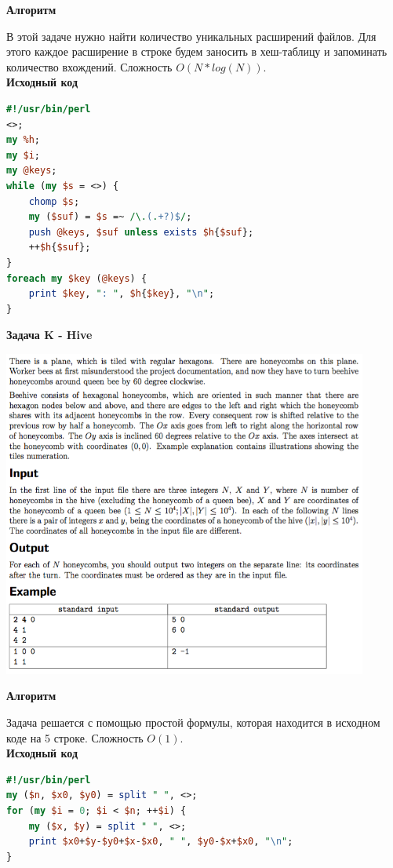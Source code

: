 \documentclass[a4paper,12pt]{article}
\begin{document}
\textbf{{\large Алгоритм}}

В этой задаче нужно найти количество уникальных расширений файлов. Для этого каждое расширение в строке будем заносить в хеш-таблицу и запоминать количество вхождений. Сложность $O(N * log(N))$. \\

\textbf{{\large Исходный код}} \\
\begin{lstlisting}[language=Perl]
#!/usr/bin/perl
<>;
my %h;
my $i;
my @keys;
while (my $s = <>) {
	chomp $s;
	my ($suf) = $s =~ /\.(.+?)$/;
	push @keys, $suf unless exists $h{$suf};
	++$h{$suf};
}
foreach my $key (@keys) {
	print $key, ": ", $h{$key}, "\n";
}
\end{lstlisting}


\newpage
\textbf{{\large Задача K - Hive}}

\begin{center}
\includegraphics[width=0.9\textwidth]{OC_Siberia/K.png}\\ [1cm]
\end{center}

\textbf{{\large Алгоритм}}

Задача решается с помощью простой формулы, которая находится в исходном коде на 5 строке. Сложность $O(1)$. \\

\textbf{{\large Исходный код}} \\
\begin{lstlisting}[language=Perl]
#!/usr/bin/perl
my ($n, $x0, $y0) = split " ", <>;
for (my $i = 0; $i < $n; ++$i) {
	my ($x, $y) = split " ", <>;
	print $x0+$y-$y0+$x-$x0, " ", $y0-$x+$x0, "\n";
}
\end{lstlisting}
\end{document}
